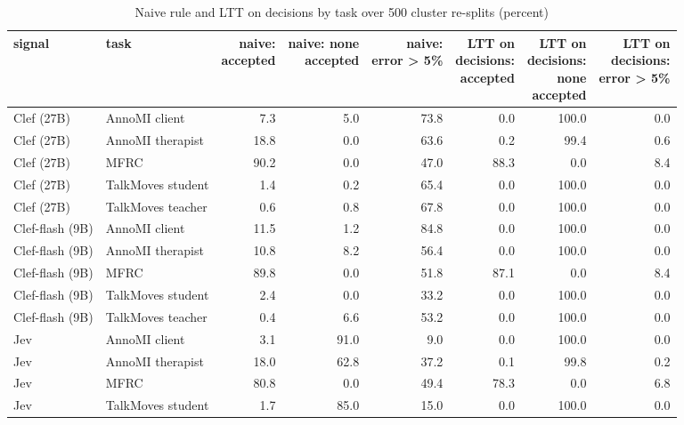 \begin{table}[t]
\centering
\small
\caption{Naive rule and LTT on decisions by task over 500 cluster re-splits (percent)}
\label{tab:tab07b_resplits_by_task}
\begin{adjustbox}{max width=\linewidth}
\begin{tabular}{llrrrrrr}
\toprule
signal & task & \makecell[br]{naive: \\{} accepted} & \makecell[br]{naive: none \\{} accepted} & \makecell[br]{naive: \\{} error > 5\%} & \makecell[br]{LTT on \\{} decisions: \\{} accepted} & \makecell[br]{LTT on \\{} decisions: \\{} none \\{} accepted} & \makecell[br]{LTT on \\{} decisions: \\{} error > 5\%} \\
\midrule
Clef (27B) & AnnoMI client & 7.3 & 5.0 & 73.8 & 0.0 & 100.0 & 0.0 \\
Clef (27B) & AnnoMI therapist & 18.8 & 0.0 & 63.6 & 0.2 & 99.4 & 0.6 \\
Clef (27B) & MFRC & 90.2 & 0.0 & 47.0 & 88.3 & 0.0 & 8.4 \\
Clef (27B) & TalkMoves student & 1.4 & 0.2 & 65.4 & 0.0 & 100.0 & 0.0 \\
Clef (27B) & TalkMoves teacher & 0.6 & 0.8 & 67.8 & 0.0 & 100.0 & 0.0 \\
Clef-flash (9B) & AnnoMI client & 11.5 & 1.2 & 84.8 & 0.0 & 100.0 & 0.0 \\
Clef-flash (9B) & AnnoMI therapist & 10.8 & 8.2 & 56.4 & 0.0 & 100.0 & 0.0 \\
Clef-flash (9B) & MFRC & 89.8 & 0.0 & 51.8 & 87.1 & 0.0 & 8.4 \\
Clef-flash (9B) & TalkMoves student & 2.4 & 0.0 & 33.2 & 0.0 & 100.0 & 0.0 \\
Clef-flash (9B) & TalkMoves teacher & 0.4 & 6.6 & 53.2 & 0.0 & 100.0 & 0.0 \\
Jev & AnnoMI client & 3.1 & 91.0 & 9.0 & 0.0 & 100.0 & 0.0 \\
Jev & AnnoMI therapist & 18.0 & 62.8 & 37.2 & 0.1 & 99.8 & 0.2 \\
Jev & MFRC & 80.8 & 0.0 & 49.4 & 78.3 & 0.0 & 6.8 \\
Jev & TalkMoves student & 1.7 & 85.0 & 15.0 & 0.0 & 100.0 & 0.0 \\

\end{tabular}
\end{adjustbox}
\end{table}
